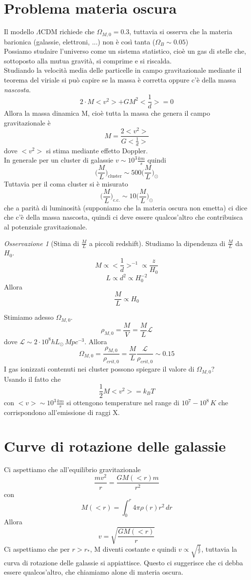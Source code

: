 \documentclass[10pt,a4paper]{article}
\let\oldmarginpar\marginpar
\renewcommand\marginpar[1]{\-\oldmarginpar[\raggedleft\footnotesize #1]%
	{\raggedright\footnotesize #1}}
\theoremstyle{break}
\theoremstyle{remark}
\newtheorem{oss}{Osservazione}
\theoremstyle{definition}
\begin{document}
\section{Problema materia oscura}
Il modello $\Lambda$CDM richiede che $\Omega_{M, 0} = 0.3$, tuttavia si osserva che la materia barionica (galassie, elettroni, ...) non è così tanta ($\Omega_B \sim 0.05$) \\
Possiamo studaire l'universo come un sistema statistico, cioè un gas di stelle che, sottoposto alla mutua gravità, si comprime e si riscalda. \\
Studiando la velocità media delle particelle in campo gravitazionale mediante il teorema del viriale si può capire se la massa è corretta oppure c'è della massa \textit{nascosta}.
\[
2\cdot M <v^2> +  G M^2 <\frac1d> = 0
\]
Allora la massa dinamica M, cioè tutta la massa che genera il campo gravitazionale è
\[
M = \frac{2 <v^2>}{G <\frac1d>}
\]
dove $<v^2>$ si stima mediante effetto Doppler. \\
In generale per un cluster di galassie $v \sim 10^3 \frac{km}{s}$ quindi 
\[
\bigg(\frac{M}{L}\bigg)_{\text{cluster}} \sim 500\bigg(\frac{M}{L}\bigg)_\odot
\]
Tuttavia per il coma cluster si è misurato 
\[
\bigg(\frac{M}{L}\bigg)_{\text{c.c.}} \sim 10\bigg(\frac{M}{L}\bigg)_\odot
\]
che a parità di luminosità (supponiamo che la materia oscura non emetta) ci dice che c'è della massa nascosta, quindi ci deve essere qualcos'altro che contribuisca al potenziale gravitazionale.
\begin{oss}[Stima di $\frac{M}{L}$ a piccoli redshift]
	Studiamo la dipendenza di $\frac{M}{L}$ da $H_0$.\\
	\[
	M \propto <\frac1d>^{-1} \propto \frac{z}{H_0}
	\]
	\marginpar{Dalla legge di Hubble $H_0 d = z$}
	\[
	L \propto d^2 \propto H_0^{-2}
	\]
	Allora
	\[
	\frac{M}{L} \propto H_0
	\]
\end{oss}

Stimiamo adesso $\Omega_{M, 0}$.
\[
\rho_{M, 0} = \frac{M}{V} = \frac{M}{L} \mathcal{L}
\]
dove $\mathcal{L} \sim 2\cdot 10^8 h L_\odot\, Mpc^{-3}$. Allora
\[
\Omega_{M, 0} = \frac{\rho_{M, 0}}{\rho_{crit, 0}} = \frac{M}{L} \frac{\mathcal{L}}{\rho_{crit, 0}} \sim 0.15
\]
I gas ionizzati contenuti nei cluster possono spiegare il valore di $\Omega_{M, 0}$?\\
Usando il fatto che 
\[
\frac12 M <v^2> = k_B T
\]
con $<v> \sim 10^3 \frac{km}{s}$ si ottengono temperature nel range di $10^7 - 10^8 \, K$ che corrispondono all'emissione di raggi X.
\section{Curve di rotazione delle galassie}
Ci aspettiamo che all'equilibrio gravitazionale 
\[
\frac{m v^2}{r} = \frac{G M(<r)m}{r^2}
\]
con 
\[
M(<r) = \int_{0}^{r} 4 \pi \rho(r) r^2 \, dr
\]
Allora 
\[
v = \sqrt{\frac{G M(<r)}{r}}
\]
Ci aspettiamo che per $r > r_*$, M diventi costante e quindi $v \propto \sqrt{\frac1r}$, tuttavia la curva di rotazione delle galassie si appiattisce. Questo ci suggerisce che ci debba essere qualcos'altro, che chiamiamo alone di materia oscura.
\end{document}
